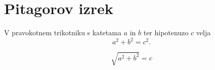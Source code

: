 \documentclass{article}
\begin{document}
\section*{Pitagorov izrek}
V pravokotnem trikotniku s katetama \(a\) in \(b\) ter hipotenuzo \(c\) velja
\[ a^2 + b^2 = c^2. \]
\begin{center} 
\[ \sqrt{a^2 + b^2} = c \]
\end{center}
\end{document}
